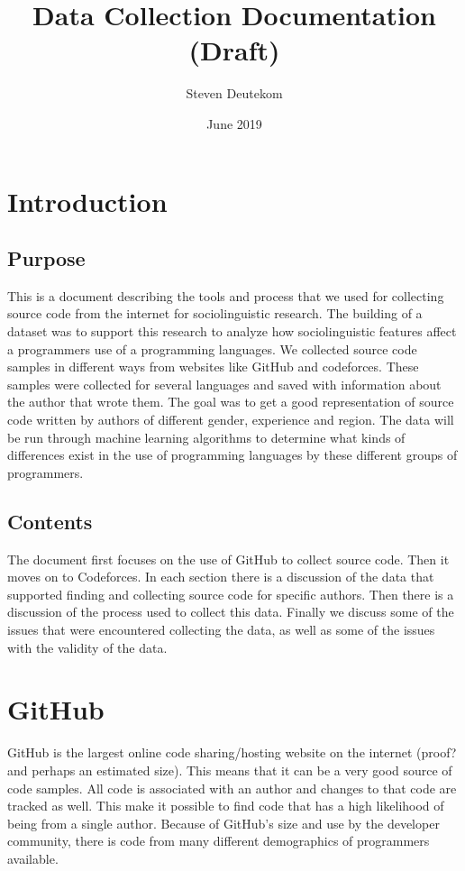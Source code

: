 \documentclass{article}
\begin{document}
\title{Data Collection Documentation (Draft)}
\author{Steven Deutekom}
\date{June 2019}
\maketitle

\newpage
\tableofcontents

\newpage
\section{Introduction}
\subsection{Purpose}
This is a document describing the tools and process that we used for collecting source code from the internet for sociolinguistic research. The building of a dataset was to support this research to analyze how sociolinguistic features affect a programmers use of a programming languages. We collected source code samples in different ways from websites like GitHub and codeforces. These samples were collected for several languages and saved with information about the author that wrote them. The goal was to get a good representation of source code written by authors of different gender, experience and region. The data will be run through machine learning algorithms to determine what kinds of differences exist in the use of programming languages by these different groups of programmers.

\subsection{Contents}
The document first focuses on the use of GitHub to collect source code. Then it moves on to Codeforces. In each section there is a discussion of the data that supported finding and collecting source code for specific authors. Then there is a discussion of the process used to collect this data. Finally we discuss some of the issues that were encountered collecting the data, as well as some of the issues with the validity of the data.


\section{GitHub}
GitHub is the largest online code sharing/hosting website on the internet (proof? and perhaps an estimated size). This means that it can be a very good source of code samples. All code is associated with an author and changes to that code are tracked as well. This make it possible to find code that has a high likelihood of being from a single author. Because of GitHub's size and use by the developer community, there is code from many different demographics of programmers available.
\end{document}
